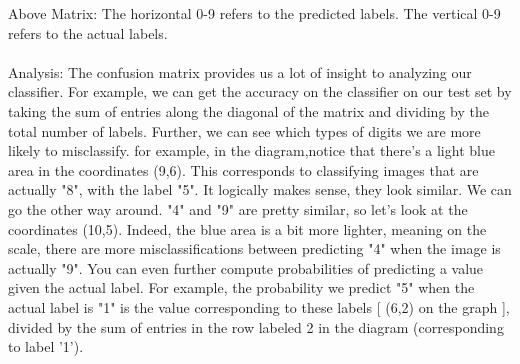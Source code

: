 \documentclass[11pt]{article}
\begin{document}
Above Matrix: The horizontal 0-9 refers to the predicted labels. The vertical 0-9 refers to the actual labels.
\\\\
Analysis: The confusion matrix provides us a lot of insight to analyzing our classifier. For example, we can get the accuracy on the classifier on our test set by taking the sum of entries along the diagonal of the matrix and dividing by the total number of labels. Further, we can see which types of digits we are more likely to misclassify. for example, in the diagram,notice that there's a light blue area in the coordinates (9,6). This corresponds to classifying images that are actually "8", with the label "5". It logically makes sense, they look similar. We can go the other way around. "4" and "9" are pretty similar, so let's look at the coordinates (10,5). Indeed, the blue area is a bit more lighter, meaning on the scale, there are more misclassifications between predicting "4" when the image is actually "9". You can even further compute probabilities of predicting a value given the actual label. For example, the probability we predict "5" when the actual label is "1" is the value corresponding to these labels [ (6,2) on the graph ], divided by the sum of entries in the row labeled 2 in the diagram (corresponding to label '1').
\\\\
\end{document}
